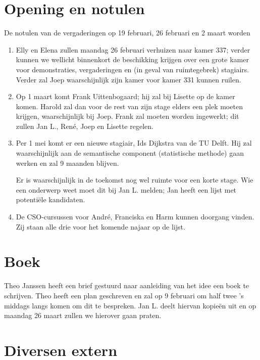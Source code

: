 \section {Opening en notulen}
De notulen van de vergaderingen op 19 februari, 26 februari en 2 maart worden
\begin{enumerate}
   \item Elly en Elena zullen maandag 26 februari verhuizen naar kamer 337;
         verder kunnen we wellicht binnenkort de beschikking krijgen over een 
         grote kamer voor demonstraties, vergaderingen en (in geval van
         ruimtegebrek) stagiairs. Verder zal Joep waarschijnlijk zijn kamer
         voor kamer 331 kunnen ruilen.
   \item Op 1 maart komt Frank Uittenbogaard; hij zal bij Lisette op de
         kamer komen. Harold zal dan voor de rest van zijn stage elders een 
         plek moeten krijgen, waarschijnlijk bij Joep. Frank zal moeten worden
         ingewerkt; dit zullen Jan L., Ren\'{e}, Joep en Lisette regelen.
   \item Per 1 mei komt er een nieuwe stagiair, Ids Dijkstra van de TU Delft.
         Hij zal waarschijnlijk aan de semantische component (statistische
         methode) gaan werken en zal 9 maanden blijven.

         Er is waarschijnlijk in de toekomst nog wel ruimte voor een korte
         stage. Wie een onderwerp weet moet dit bij Jan L. melden; Jan
         heeft een lijst met potenti\"{e}le kandidaten.

   \item De CSO-cursussen voor Andr\'{e}, Franciska en Harm kunnen doorgang 
         vinden. Zij staan alle drie voor het komende najaar op de lijst.
\end{enumerate}

\section {Boek}

Theo Janssen heeft een brief gestuurd naar aanleiding van het idee een boek
te schrijven. Theo heeft een plan geschreven en zal op 9 februari om half twee
's middags langs komen om dit te bespreken. Jan L. deelt hiervan kopie\"{e}n uit
en op maandag 26 maart zullen we hierover gaan praten.

\section {Diversen extern}

